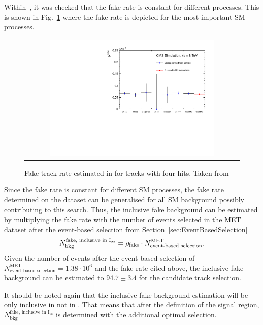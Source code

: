 Within~\cite{bib:CMS:DT_Thesis,bib:CMS:DT_8TeV_AN}, it was checked that the fake rate is constant for different processes.
This is shown in Fig.~\ref{fig:FakeRate} where the fake rate is depicted for the most important SM processes.
\begin{figure}[!b]
  \centering 
  \begin{tabular}{c}
    \includegraphics[width=0.79\textwidth]{figures/analysis/Background/fakeTrkRates.pdf}
  \end{tabular}
  \caption{Fake track rate estimated in \cite{bib:CMS:DT_Thesis,bib:CMS:DT_8TeV_AN} for tracks with four hits. Taken from \cite{bib:CMS:DT_8TeV_AN} }
  \label{fig:FakeRate}
\end{figure}
Since the fake rate is constant for different SM processes, the fake rate determined on the \Zlep dataset can be generalised for all SM background possibly contributing to this search.
Thus, the inclusive fake background can be estimated by multiplying the fake rate with the number of events selected in the MET dataset after the event-based selection from Section~\ref{sec:EventBasedSelection}
\begin{equation*}
N^{\text{fake, inclusive in I$_{\text{as}}$}}_{\text{bkg}} = \rho_{\text{fake}} \cdot N_{\text{event-based selection}}^{\text{MET}}.
\end{equation*}
Given the number of events after the event-based selection of $N_{\text{event-based selection}}^{\text{MET}} = 1.38\cdot10^6$ and the fake rate cited above, 
the inclusive fake background can be estimated to $94.7\pm3.4$ for the candidate track selection.

It should be noted again that the inclusive fake background estimation will be only inclusive in \ias not in \pt.
That means that after the definition of the signal region, $N^{\text{fake, inclusive in I$_{\text{as}}$}}_{\text{bkg}}$ is determined with the additional optimal \pt selection.

